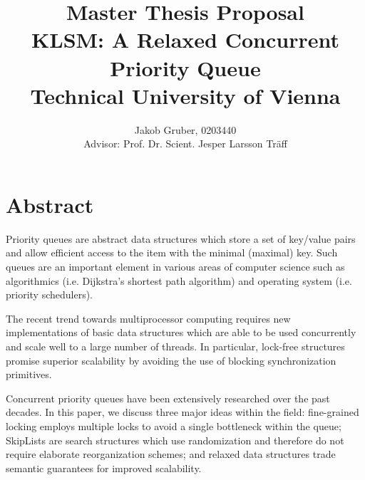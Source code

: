 \documentclass[a4paper,10pt]{article}
\title{Master Thesis Proposal \\
       KLSM: A Relaxed Concurrent Priority Queue \\
       Technical University of Vienna}
\author{Jakob Gruber, 0203440 \\
        Advisor: Prof. Dr. Scient. Jesper Larsson Tr\"aff}
\begin{document}
\maketitle

\section{Abstract}

Priority queues are abstract data structures which store a set of key/value pairs
and allow efficient access to the item with the minimal (maximal) key. Such queues are an important
element in various areas of computer science such as algorithmics (i.e. Dijkstra's shortest
path algorithm) and operating system (i.e. priority schedulers).

The recent trend towards multiprocessor computing requires new implementations of basic
data structures which are able to be used concurrently and scale well to a large number
of threads. In particular, lock-free structures promise superior scalability by avoiding
the use of blocking synchronization primitives.

Concurrent priority queues have been extensively researched over the past decades.
In this paper, we discuss three major ideas within the field: fine-grained locking
employs multiple locks to avoid a single bottleneck within the queue; SkipLists
are search structures which use randomization and therefore do not require elaborate reorganization
schemes; and relaxed data structures trade semantic guarantees for improved scalability.

\nocite{*} %
\printbibliography
\end{document}
